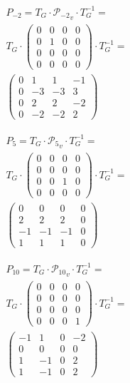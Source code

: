 \documentclass[12pt, a4paper]{article}
\begin{document}
    \begin{multline}
        P_{-2} = T_G \cdot {\mathcal{P}_{-2}}_v \cdot T_G^{-1} = \\
         T_G \cdot \left(\begin{matrix}
            0 & 0 & 0 & 0 \\
            0 & 1 & 0 & 0 \\
            0 & 0 & 0 & 0 \\
            0 & 0 & 0 & 0
        \end{matrix}\right) \cdot T_G^{-1} = \\
        \left(\begin{matrix}
            0 & 1 & 1 & -1 \\
            0 & -3 & -3 & 3 \\
            0 & 2 & 2 & -2 \\
            0 & -2 & -2 & 2
        \end{matrix}\right)
    \end{multline}

    \begin{multline}
        P_{5} = T_G \cdot {\mathcal{P}_{5}}_v \cdot T_G^{-1} = \\
         T_G \cdot \left(\begin{matrix}
            0 & 0 & 0 & 0 \\
            0 & 0 & 0 & 0 \\
            0 & 0 & 1 & 0 \\
            0 & 0 & 0 & 0
        \end{matrix}\right) \cdot T_G^{-1} = \\
        \left(\begin{matrix}
            0 & 0 & 0 & 0 \\
            2 & 2 & 2 & 0 \\
            -1 & -1 & -1 & 0 \\
            1 & 1 & 1 & 0
        \end{matrix}\right)
    \end{multline}


    \begin{multline}
        P_{10} = T_G \cdot {\mathcal{P}_{10}}_v \cdot T_G^{-1} = \\
         T_G \cdot \left(\begin{matrix}
            0 & 0 & 0 & 0 \\
            0 & 0 & 0 & 0 \\
            0 & 0 & 0 & 0 \\
            0 & 0 & 0 & 1
        \end{matrix}\right) \cdot T_G^{-1} = \\
        \left(\begin{matrix}
            -1 & 1 & 0 & -2 \\
            0 & 0 & 0 & 0 \\
            1 & -1 & 0 & 2 \\
            1 & -1 & 0 & 2
        \end{matrix}\right)
    \end{multline}
\end{document}
